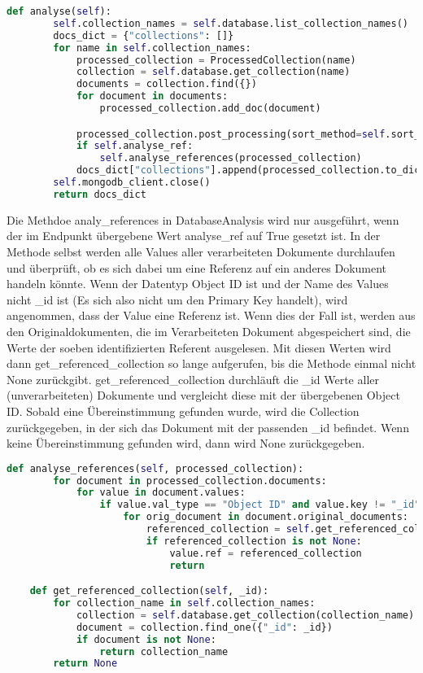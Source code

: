 \begin{lstlisting}[language=python, caption={DatabaseAnalysis.analyse},label={lst:backend_analyse}]
    def analyse(self):
        self.collection_names = self.database.list_collection_names()
        docs_dict = {"collections": []}
        for name in self.collection_names:
            processed_collection = ProcessedCollection(name)
            collection = self.database.get_collection(name)
            documents = collection.find({})
            for document in documents:
                processed_collection.add_doc(document)

            processed_collection.post_processing(sort_method=self.sort_method)
            if self.analyse_ref:
                self.analyse_references(processed_collection)
            docs_dict["collections"].append(processed_collection.to_dict())
        self.mongodb_client.close()
        return docs_dict
\end{lstlisting}

Die Methdoe analy\_references in DatabaseAnalysis wird nur ausgeführt, wenn der im Endpunkt übergebene Wert analyse\_ref auf True gesetzt ist.
In der Methode selbst werden alle Values aller verarbeiteten Dokumente durchlaufen und überprüft, ob es sich dabei um eine Referenz auf ein anderes Dokument handeln könnte.
Wenn der Datentyp Object ID ist und der Name des Values nicht \_id ist (Es sich also nicht um den Primary Key handelt), wird angenommen, dass der Value eine Referenz ist.
Wenn dies der Fall ist, werden aus den Originaldokumenten, die im Verarbeiteten Dokument abgespeichert sind, die Werte der soeben identifizierten Referent ausgelesen.
Mit diesen Werten wird dann get\_referenced\_collection so lange aufgerufen, bis die Methode einmal nicht None zurückgibt.
get\_referenced\_collection durchläuft die \_id Werte aller (unverarbeiteten) Dokumente und vergleicht diese mit der übergebenen Object ID.
Sobald eine Übereinstimmung gefunden wurde, wird die Collection zurückgegeben, in der sich das Dokument mit der passenden \_id befindet.
Wenn keine Übereinstimmung gefunden wird, dann wird None zurückgegeben.

\begin{lstlisting}[language=python, caption={DatabaseAnalysis.analyse\_references},label={lst:backend_analyse_ref}]
    def analyse_references(self, processed_collection):
        for document in processed_collection.documents:
            for value in document.values:
                if value.val_type == "Object ID" and value.key != "_id":
                    for orig_document in document.original_documents:
                        referenced_collection = self.get_referenced_collection(orig_document.get(value.key))
                        if referenced_collection is not None:
                            value.ref = referenced_collection
                            return

    def get_referenced_collection(self, _id):
        for collection_name in self.collection_names:
            collection = self.database.get_collection(collection_name)
            document = collection.find_one({"_id": _id})
            if document is not None:
                return collection_name
        return None
\end{lstlisting}

